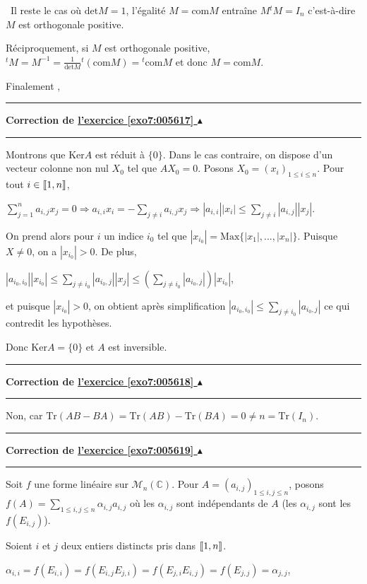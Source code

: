 \documentclass[11pt,a4paper]{article}
\newcommand{\Rr}{\mathbb{R}} \newcommand{\R}{\mathbb{R}}
\newcommand{\Cc}{\mathbb{C}} \newcommand{\C}{\mathbb{C}}
\newcommand{\llbracket}{\left[\kern-0.15em\left[}
\newcommand{\rrbracket}{\right]\kern-0.15em\right]}
\newcounter{exo}
\newcommand{\correction}[1]{\hypertarget{cor7:#1}{}\label{cor7:#1}{\bf Correction de \hyperlink{exo7:#1}{l'exercice \ref{exo7:#1} $\blacktriangle$}}\vspace{1mm}\hrule\vspace{1mm}}
\newcommand{\fincorrection}{\vspace{1mm}\hrule\vspace*{7mm}}
\begin{document}
\textbullet~Il reste le cas où $\text{det}M=1$, l'égalité $M=\text{com}M$ entraîne $M{^t}M=I_n$ c'est-à-dire $M$ est orthogonale positive.

Réciproquement, si $M$ est orthogonale positive, ${^t}M=M^{-1}=\frac{1}{\text{det}M}{^t}(\text{com}M)={^t}\text{com}M$ et donc $M=\text{com}M$.

Finalement ,

\begin{center}
\shadowbox{
$\mathcal{S}=\{0\}\cup O_n^+(\Rr)$.
}
\end{center}
\fincorrection
\correction{005617}
Montrons que $\text{Ker}A$ est réduit à $\{0\}$. Dans le cas contraire, on dispose d'un vecteur colonne non nul $X_0$ tel que $AX_0 = 0$. Posons $X_0=(x_i)_{1\leqslant i\leqslant n}$. Pour tout $i\in\llbracket1,n\rrbracket$,

\begin{center}
$\sum_{j=1}^{n}a_{i,j}x_j= 0\Rightarrow a_{i,i}x_i =-\sum_{j\neq i}^{}a_{i,j}x_j\Rightarrow |a_{i,i}||x_i|\leqslant\sum_{j\neq i}^{}|a_{i,j}||x_j|$.
\end{center}

On prend alors pour $i$ un indice $i_0$ tel que $|x_{i_0}| =\text{Max}\{|x_1|,...,|x_n|\}$. Puisque $X\neq0$, on a $|x_{i_0}|>0$. De plus,

\begin{center}
$|a_{i_0,i_0}||x_{i_0}|\leqslant\sum_{j\neq i_0}^{}|a_{i_0,j}||x_j|\leqslant\left(\sum_{j\neq i_0}^{}|a_{i_0,j}|\right)|x_{i_0}|$,
\end{center}

et puisque $|x_{i_0}|>0$, on obtient après simplification $|a_{i_0,i_0}|\leqslant\sum_{j\neq i_0}^{}|a_{i_0,j}|$ ce qui contredit les hypothèses.

Donc $\text{Ker}A=\{0\}$ et $A$ est inversible.

\fincorrection
\correction{005618}
Non, car $\text{Tr}(AB-BA)=\text{Tr}(AB) -\text{Tr}(BA) = 0\neq n =\text{Tr}(I_n)$.
\fincorrection
\correction{005619}
Soit $f$ une forme linéaire sur $\mathcal{M}_n(\Cc)$. Pour $A=(a_{i,j})_{1\leqslant i,j\leqslant n}$, posons $f(A)=\sum_{1\leqslant i,j\leqslant n}^{}\alpha_{i,j}a_{i,j}$ où les $\alpha_{i,j}$ sont indépendants de $A$ (les $\alpha_{i,j}$ sont les $f(E_{i,j})$).

Soient $i$ et $j$ deux entiers distincts pris dans $\llbracket1,n\rrbracket$.

\begin{center}
$\alpha_{i,i}=f\left(E_{i,i}\right) = f\left(E_{i,j}E_{j,i}\right) = f\left(E_{j,i}E_{i,j}\right) =f\left(E_{j,j}\right)=\alpha_{j,j}$,
\end{center}
\end{document}
